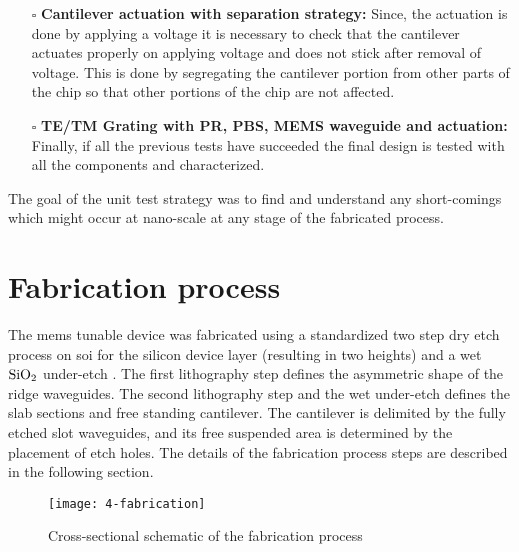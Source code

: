 \documentclass[../report.tex]{subfiles}
\begin{document}
\begin{itemize}[leftmargin=*]
	\item[$\square$] \textbf{Cantilever actuation with separation strategy:} Since, the actuation is done by applying a voltage it is necessary to check that the cantilever actuates properly on applying voltage and does not stick after removal of voltage. This is done by segregating the cantilever portion from other parts of the chip so that other portions of the chip are not affected. 
	
	\item[$\square$] \textbf{TE/TM Grating with PR, PBS, MEMS waveguide and actuation:} Finally, if all the previous tests have succeeded the final design is tested with all the components and characterized.
\end{itemize}
	
\noindent The goal of the unit test strategy was to find and understand any short-comings which might occur at nano-scale at any stage of the fabricated process.
	


\section{Fabrication process}\label{sec:fab_process}
The \gls{mems} tunable device was fabricated using a standardized two step dry etch process on \gls{soi} for the silicon device layer (resulting in two heights) and a wet $\mathrm{SiO_2}$ under-etch \cite{errando-herranz_low-power_2015}. The first lithography step defines the asymmetric shape of the ridge waveguides. The second lithography step and the wet under-etch defines the slab sections and free standing cantilever. The cantilever is delimited by the fully etched slot waveguides, and its free suspended area is determined by the placement of etch holes. The details of the fabrication process steps are described in the following section.

\begin{figure}[H] %
	\centering
	\texttt{[image: 4-fabrication]}
	\caption{Cross-sectional schematic of the fabrication process}
	\label{fig:4_fabrication}
\end{figure}

\end{document}
